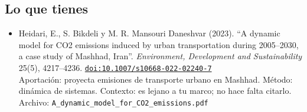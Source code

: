 \documentclass[11pt]{article}
\begin{document}
\subsection*{Lo que tienes}
\begin{itemize}
\item Heidari, E., S. Bikdeli y M. R. Mansouri Daneshvar (2023). ``A dynamic model for CO2 emissions induced by urban transportation during 2005–2030, a case study of Mashhad, Iran''. \textit{Environment, Development and Sustainability} 25(5), 4217--4236. \href{https://doi.org/10.1007/s10668-022-02240-7}{\texttt{doi:10.1007/s10668-022-02240-7}}\\
Aportación: proyecta emisiones de transporte urbano en Mashhad. Método: dinámica de sistemas. Contexto: es lejano a tu marco; no hace falta citarlo.\\
{\footnotesize Archivo: \texttt{A\_dynamic\_model\_for\_CO2\_emissions.pdf}}
\end{itemize}
\end{document}
